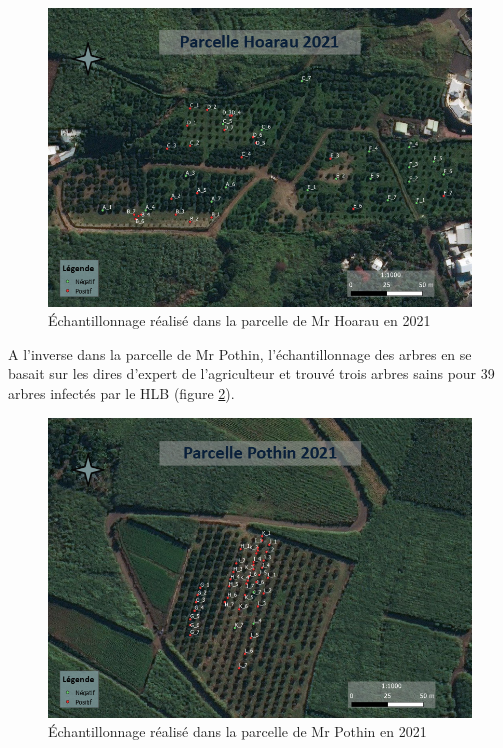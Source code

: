 \documentclass[
  11pt,
  french,
  a4paper,
  extrafontsizes,onecolumn,openright
  ]{memoir}
\begin{document}
\begin{figure}

{\centering \includegraphics[width=0.8\linewidth]{Images/Figure3} 

}

\caption{Échantillonnage réalisé dans la parcelle de Mr Hoarau en 2021}\label{fig:3}
\end{figure}

\normalsize

A l'inverse dans la parcelle de Mr Pothin, l'échantillonnage des arbres en se basait sur les dires d'expert de l'agriculteur et trouvé trois arbres sains pour 39 arbres infectés par le HLB (figure \ref{fig:4}).

\scriptsize

\begin{figure}

{\centering \includegraphics[width=0.8\linewidth]{Images/Figure4} 

}

\caption{Échantillonnage réalisé dans la parcelle de Mr Pothin en 2021}\label{fig:4}
\end{figure}
\end{document}
